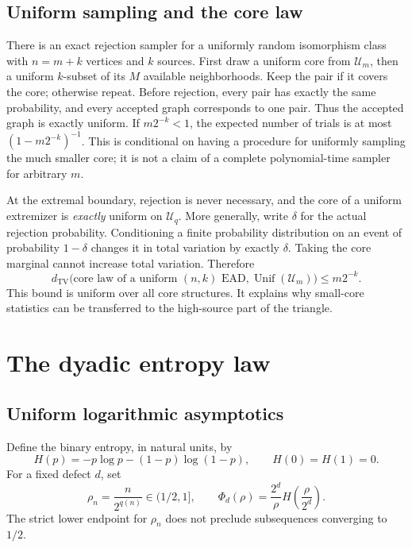 \documentclass[11pt,a4paper]{article}
\theoremstyle{definition}
\newcommand{\U}{\mathcal U}
\newcommand{\TV}{d_{\mathrm{TV}}}
\begin{document}
\subsection{Uniform sampling and the core law}
There is an exact rejection sampler for a uniformly random isomorphism
class with $n=m+k$ vertices and $k$ sources. First draw a uniform core
from $\U_m$, then a uniform $k$-subset of its $M$ available neighborhoods.
Keep the pair if it covers the core; otherwise repeat. Before rejection,
every pair has exactly the same probability, and every accepted graph
corresponds to one pair. Thus the accepted graph is exactly uniform.
If $m2^{-k}<1$, the expected number of trials is at most
$(1-m2^{-k})^{-1}$. This is conditional on having a procedure for uniformly
sampling the much smaller core; it is not a claim of a complete
polynomial-time sampler for arbitrary $m$.

At the extremal boundary, rejection is never necessary, and the core
of a uniform extremizer is \emph{exactly} uniform on $\U_q$.
More generally, write $\delta$ for the actual rejection probability.
Conditioning a finite probability distribution on an event of probability
$1-\delta$ changes it in total variation by exactly $\delta$.
Taking the core marginal cannot increase total variation. Therefore
\begin{equation}\label{sbd:eq:core-tv}
 \TV\bigl(\text{core law of a uniform }(n,k)\text{ EAD},
               \operatorname{Unif}(\U_m)\bigr)
 \le m2^{-k}.
\end{equation}
This bound is uniform over all core structures. It explains why small-core
statistics can be transferred to the high-source part of the triangle.

\section{The dyadic entropy law}\label{sbd:sec:entropy}

\subsection{Uniform logarithmic asymptotics}
Define the binary entropy, in natural units, by
\[
 H(p)=-p\log p-(1-p)\log(1-p),\qquad H(0)=H(1)=0.
\]
For a fixed defect $d$, set
\begin{equation}\label{sbd:eq:phidef}
 \rho_n=\frac{n}{2^{q(n)}}\in(1/2,1],\qquad
 \Phi_d(\rho)=\frac{2^d}{\rho}H\!\left(\frac{\rho}{2^d}\right).
\end{equation}
The strict lower endpoint for $\rho_n$ does not preclude subsequences
converging to $1/2$.
\end{document}
